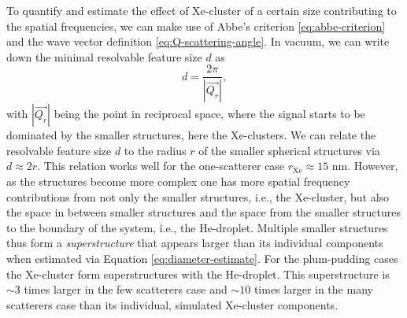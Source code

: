 %
To quantify and estimate the effect of Xe-cluster of a certain size contributing to the spatial frequencies, we can make use of Abbe's criterion \eqref{eq:abbe-criterion} and the wave vector definition \eqref{eq:Q-scattering-angle}. In vacuum, we can write down the minimal resolvable feature size $d$ as
\begin{equation}
d = \frac{2\pi}{\left|\vec{Q_{r}}\right|},
\label{eq:diameter-estimate}
\end{equation}
with $\left|\vec{Q_{r}}\right|$ being the point in reciprocal space, where the signal starts to be dominated by the smaller structures, here the Xe-clusters. We can relate the resolvable feature size $d$ to the radius $r$ of the smaller spherical structures via $d\approx 2 r$. This relation works well for the one-scatterer case $r_{\text{Xe}}\approx 15$ nm. However, as the structures become more complex one has more spatial frequency contributions from not only the smaller structures, i.e., the Xe-cluster, but also the space in between smaller structures and the space from the smaller structures to the boundary of the system, i.e., the He-droplet. Multiple smaller structures thus form a \textit{superstructure} that appears larger than its individual components when estimated via Equation \eqref{eq:diameter-estimate}. For the plum-pudding cases the Xe-cluster form superstructures with the He-droplet. This superstructure is $\sim 3$ times larger in the few scatterers case and $\sim 10$ times larger in the many scatterers case than its individual, simulated Xe-cluster components.\\[1\baselineskip]
